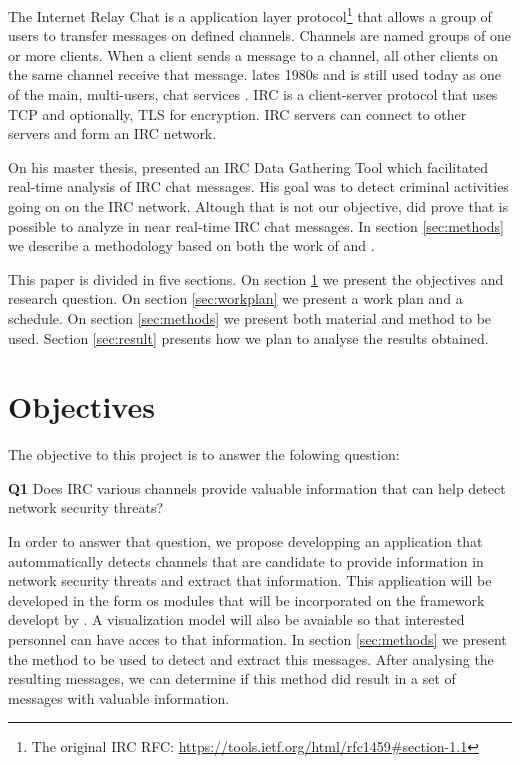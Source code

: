 \documentclass[12pt]{article}
\begin{document}
The Internet Relay Chat is a application layer protocol\footnote{%
The original IRC RFC: \url{https://tools.ietf.org/html/rfc1459#section-1.1}}
that allows a group of users to transfer messages on defined channels.
%
Channels are named groups of one or more clients. When a client sends a
message to a channel, all other clients on the same channel receive that
message.
lates 1980s and is still
used today as one of the main, multi-users, chat services \cite{michels2013}.
%
IRC is a client-server protocol that uses TCP and optionally, TLS for
encryption.
%
IRC servers can connect to other servers and form an IRC network.

On his master thesis, \cite{michels2013} presented an IRC Data Gathering Tool which
facilitated real-time analysis of IRC chat messages. His goal was to detect
criminal activities going on on the IRC network.
%
Altough that is not our objective, \cite{michels2013} did prove that is possible
to analyze in near real-time IRC chat messages.
%
In section \ref{sec:methods} we describe a methodology based on both the work
of \cite{campiolo2013} and \cite{michels2013}.

This paper is divided in five sections. On section \ref{sec:objectives} we
present the objectives and research question. On section \ref{sec:workplan}
we present a work plan and a schedule. On section \ref{sec:methods} we present
both material and method to be used. Section \ref{sec:result} presents how we
plan to analyse the results obtained.

\section{Objectives} \label{sec:objectives}

The objective to this project is to answer the folowing question:

\begin{description}
    \item{\textbf{Q1} Does IRC various channels provide valuable information
        that can help detect network security threats?}
\end{description}

In order to answer that question, we propose developping an application that
autommatically detects channels that are candidate to provide information
in network security threats and extract that information.
%
This application will be developed in the form os modules that will be
incorporated on the framework developt by \cite{campiolo2013}.
%
A visualization model will also be avaiable so that interested personnel can
have acces to that information.
%
In section \ref{sec:methods} we present the method to be used to detect and
extract this messages.
%
After analysing the resulting messages, we can determine if this method
did result in a set of messages with valuable information.
\end{document}
